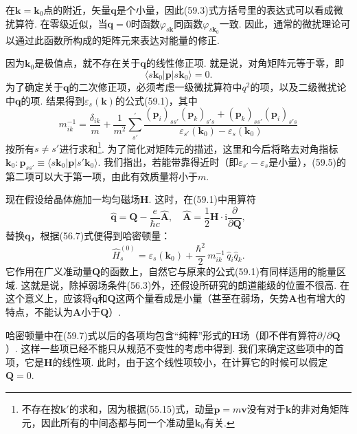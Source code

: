 在$\bm k=\bm k_0$点的附近，矢量$\bm q$是个小量，因此(59.3)式方括号里的表达式可以看成微扰算符. 在零级近似，当$\bm q=0$时函数$\varphi_{s\bm k}$同函数$\varphi_{s\bm k_0}$一致. 因此，通常的微扰理论可以通过此函数所构成的矩阵元来表达对能量的修正.

因为$\bm k_0$是极值点，就不存在关于$\bm q$的线性修正项. 就是说，对角矩阵元等于零，即
\begin{equation}
\langle s\bm k_0|\bm p|s\bm k_0\rangle=0.
\label{59.4}
\end{equation}
为了确定关于$\bm q$的二次修正项，必须考虑一级微扰算符中$q^2$的项，以及二级微扰论中$\bm q$的项. 结果得到$\varepsilon_s(\bm k)$的公式(59.1)，其中
\begin{equation}
m^{-1}_{ik}=\frac{\delta_{ik}}{m}+\frac{1}{m^2}\sum_{s'}^{\prime}
\frac{(\bm p_i)_{ss'}(\bm p_k)_{s's}+(\bm p_k)_{ss'}(\bm p_i)_{s's}}
{\varepsilon_{s'}(\bm k_0)-\varepsilon_s(\bm k_0)}
\label{59.5}
\end{equation}
按所有$s\neq s'$进行求和\footnote{不存在按$\bm k'$的求和，因为根据(55.15)式，动量$\bm p=m\bm v$没有对于$\bm k$的非对角矩阵元，因此所有的中间态都与同一个准动量$\bm k_0$有关.}. 为了简化对矩阵元的描述，这里和今后将略去对角指标$\bm k_0: \bm p_{ss'}\equiv\langle s\bm k_0|\bm p|s'\bm k_0\rangle$. 我们指出，若能带靠得近时（即$\varepsilon_{s'}-\varepsilon_s$是小量），(59.5)的第二项可以大于第一项，由此有效质量将小于$m$.

现在假设给晶体施加一均匀磁场$\bm H$. 这时，在(59.1)中用算符
\begin{equation}
\hat{\bm q}=\bm Q-\frac{e}{\hbar c}\hat{\bm A},\quad
\hat{\bm A}=\frac{1}{2}\bm H\cdot\mathrm i\frac{\partial}{\partial\bm Q},
\label{59.6}
\end{equation}
替换$\bm q$，根据(56.7)式便得到哈密顿量：
\begin{equation}
\hat H^{(0)}_s=\varepsilon_s(\bm k_0)+\frac{\hbar^2}{2}\,m^{-1}_{ik}\,\hat q_i\hat q_k.
\label{59.7}
\end{equation}
它作用在广义准动量$\bm Q$的函数上，自然它与原来的公式(59.1)有同样适用的能量区域. 这就是说，除掉弱场条件(56.3)外，还假设所研究的朗道能级的位置不很高. 在这个意义上，应该将$\bm q$和$\bm Q$这两个量看成是小量（甚至在弱场，矢势$\bm A$也有增大的特点，不能认为$\bm A$小于$\bm Q$）.

哈密顿量中在(59.7)式以后的各项均包含“纯粹”形式的$\bm H$场（即不伴有算符$\partial/\partial\bm Q$）. 这样一些项已经不能只从规范不变性的考虑中得到. 我们来确定这些项中的首项，它是$\bm H$的线性项. 此时，由于这个线性项较小，在计算它的时候可以假定$\bm Q=0$.

